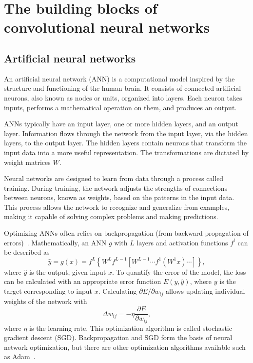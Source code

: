 
\section[CNN building blocks]{The building blocks of convolutional neural networks}

\subsection{Artificial neural networks}
An artificial neural network (ANN) is a computational model inspired by the structure and functioning of the human brain.
It consists of connected artificial neurons, also known as nodes or units, organized into layers.
Each neuron takes inputs, performs a mathematical operation on them, and produces an output.

ANNs typically have an input layer, one or more hidden layers, and an output layer.
Information flows through the network from the input layer, via the hidden layers, to the output layer.
The hidden layers contain neurons that transform the input data into a more useful representation.
The transformations are dictated by weight matrices $W$.

Neural networks are designed to learn from data through a process called training.
During training, the network adjusts the strengths of connections between neurons, known as weights, based on the patterns in the input data.
This process allows the network to recognize and generalize from examples, making it capable of solving complex problems and making predictions.

Optimizing ANNs often relies on backpropagation (from backward propagation of errors)~.
Mathematically, an ANN $g$ with $L$ layers and activation functions $f^l$ can be described as
\begin{equation}
    \hat{y} = g(x) = f^L \left\{W^L f^{L-1} \left[W^{L-1} \cdots f^1 \left(W^1 x\right) \cdots \right] \right\},
\end{equation}
where $\hat{y}$ is the output, given input $x$.
To quantify the error of the model, the loss can be calculated with an appropriate error function $E(y, \hat{y})$, where $y$ is the target corresponding to input $x$.
Calculating $\partial E / \partial w_{ij}$ allows updating individual weights of the network with \eg
\begin{equation}
    \Delta w_{ij} = -\eta \frac{\partial E}{\partial w_{ij}},
\end{equation}
where $\eta$ is the learning rate.
This optimization algorithm is called stochastic gradient descent (SGD).
Backpropagation and SGD form the basis of neural network optimization, but there are other optimization algorithms available such as Adam~.

